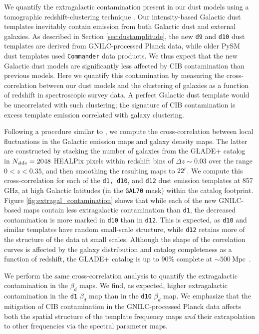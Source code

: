\documentclass[twocolumn]{aastex631}
\begin{document}
We quantify the extragalactic contamination present in our dust models using a tomographic redshift-clustering technique \citep{Schmidt:2015, Chiang:2019}. Our intensity-based Galactic dust templates inevitably contain emission from both Galactic dust and external galaxies. As described in Section \ref{sec:dustamplitude}, the new \texttt{d9} and \texttt{d10} dust templates are derived from GNILC-processed Planck data, while older PySM dust templates used \texttt{Commander} data products. We thus expect that the new Galactic dust models are significantly less affected by CIB contamination than previous models. Here we quantify this contamination by measuring the cross-correlation between our dust models and the clustering of galaxies as a function of redshift in spectroscopic survey data. A perfect Galactic dust template would be uncorrelated with such clustering; the signature of CIB contamination is excess template emission correlated with galaxy clustering. 

Following a procedure similar to \citet{Chiang:2019}, we compute the cross-correlation between local fluctuations in the Galactic emission maps and galaxy density maps. The latter are constructed by stacking the number of galaxies from the GLADE+ catalog~\citep{Dalya:2022} in $N_{\rm side} = 2048$ HEALPix pixels within redshift bins of $\Delta z \sim 0.03$ over the range $ 0 < z < 0.35$, and then smoothing the resulting maps to $22\mbox{$^\prime$}$. We compute this cross-correlation for each of the \texttt{d1, d10}, and \texttt{d12} dust emission templates at 857 GHz, at high Galactic latitudes (in the \texttt{GAL70} mask) within the catalog footprint. Figure \ref{fig:extragal_contamination} shows that while each of the new GNILC-based maps contain less extragalactic contamination than \texttt{d1}, the decreased contamination is more marked in \texttt{d10} than in \texttt{d12}. This is expected, as \texttt{d10} and similar templates have random small-scale structure, while \texttt{d12} retains more of the structure of the data at small scales. Although the shape of the correlation curves is affected by the galaxy distribution and catalog completeness as a function of redshift, the GLADE+ catalog is up to 90\% complete at $\sim500~\mathrm{Mpc}$~\citep[$z\sim0.1$;][]{Dalya:2022}.

We perform the same cross-correlation analysis to quantify the extragalactic contamination in the $\beta_d$ maps. We find, as expected, higher extragalactic contamination in the \texttt{d1} $\beta_d$ map than in the \texttt{d10} $\beta_d$ map. We emphasize that the mitigation of CIB contamination in the GNILC-processed Planck data affects both the spatial structure of the template frequency maps \textit{and} their extrapolation to other frequencies via the spectral parameter maps. 
\end{document}
